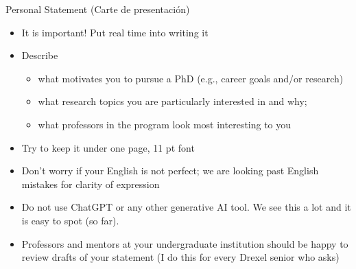 \begin{frame}[fragile]{Personal Statement \textcolor{yellow!80!black}{(Carte de presentaci\'on)}}
    \begin{itemize}
        \item It is important! Put real time into writing it
        \item Describe
        \begin{itemize}
            \item what motivates you to pursue a PhD (e.g., career goals and/or research)
            \item what research topics you are particularly interested in and why;
            \item what professors in the program look most interesting to you
        \end{itemize}
        \item Try to keep it under one page, 11 pt font
        \item Don't worry if your English is not perfect; we are looking past English mistakes for clarity of expression
        \item Do not use ChatGPT or any other generative AI tool. We see this a lot and it is easy to spot (so far).
        \item Professors and mentors at your undergraduate institution should be happy to review drafts of your statement (I do this for every Drexel senior who asks)
    \end{itemize}
\end{frame}

